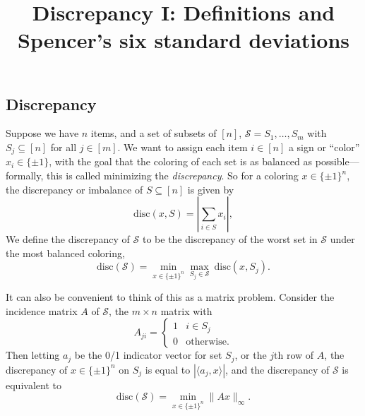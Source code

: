 \documentclass{article}
\title{Discrepancy I: Definitions and Spencer's six standard deviations}
\date{}
\theoremstyle{theorem}
\theoremstyle{definition}
\newcommand{\disc}{\mathrm{disc}}
\newcommand{\iprod}[1]{\langle #1 \rangle}
\newcommand{\cS}{\mathcal{S}}
\begin{document}
\maketitle
{}

\subsection*{Discrepancy}


Suppose we have $n$ items, and a set of subsets of $[n]$, $\mathcal{S} = S_1,\ldots,S_m$ with $S_j \subseteq [n]$ for all $j \in [m]$.
We want to assign each item $i \in [n]$ a sign or ``color'' $x_i \in \{\pm 1\}$, with the goal that the coloring of each set is as balanced as possible---formally, this is called minimizing the \emph{discrepancy}.
So for a coloring $x \in \{\pm 1\}^n$, the discrepancy  or imbalance of $S \subseteq [n]$ is given by
\[
\disc(x, S) = \left|\sum_{i \in S} x_i \right|,
\]
We define the discrepancy of $\cS$ to be the discrepancy of the worst set in $\cS$ under the most balanced coloring,
\[
\disc(\cS) = \min_{x \in \{\pm 1\}^n} \max_{S_j \in \cS}~ \disc(x,S_j).
\]

It can also be convenient to think of this as a matrix problem.
Consider the incidence matrix $A$ of $\cS$, the $m \times n$ matrix with
\[
A_{ji} = \begin{cases} 1 & i \in S_j\\
		       0 & \text{otherwise}.
		       \end{cases}
\]
Then letting $a_j$ be the 0/1 indicator vector for set $S_j$, or the $j$th row of $A$, the discrepancy of $x \in \{\pm 1\}^n$ on $S_j$ is equal to $|\iprod{a_j,x}|$, and the discrepancy of $\cS$ is equivalent to
\[
\disc(\cS) = \min_{x \in \{\pm 1\}^n} \|Ax\|_{\infty}.
\]

\end{document}
